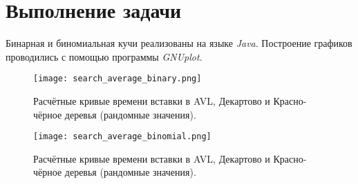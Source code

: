 \documentclass[12pt, a4paper]{report}
\begin{document}
	\newpage

	\section*{Выполнение задачи}
	Бинарная и биномиальная кучи реализованы на языке \textit{Java}. Построение графиков проводились с помощью программы \textit{GNUplot}.

	\newpage
	\vfill

	\begin{figure}[h]
		\centering
		\texttt{[image: search\_average\_binary.png]}
		\caption{Расчётные кривые времени вставки в AVL, Декартово и Красно-чёрное деревья (рандомные значения).}
	\end{figure}
	\begin{figure}[h]
		\centering
		\texttt{[image: search\_average\_binomial.png]}
		\caption{Расчётные кривые времени вставки в AVL, Декартово и Красно-чёрное деревья (рандомные значения).}
	\end{figure}
\end{document}
